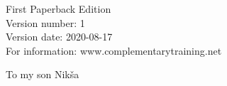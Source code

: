 {{    \vspace{10\baselineskip}
    First Paperback Edition\\
    Version number: 1\\
    Version date: 2020-08-17\\
    For information: www.complementarytraining.net
    }
    \clearpage
    \thispagestyle{empty}
    \strut
    \begin{center}
        To my son Nikša
    \end{center}
    \strut
}


\usepackage{fancyhdr}
\usepackage{truncate}
\renewcommand{\headrulewidth}{0pt}
\renewcommand{\footrulewidth}{0pt}
\pagestyle{main}

\usepackage[htt]{hyphenat}
